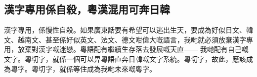 \documentclass[a5paper, 10pt, openany]{book} %
\newcommand*\CJKmovesymbol[1]{\raise.35em\hbox{#1}}
\newcommand*\CJKmove{\punctstyle{plain}%
  \let\CJKsymbol\CJKmovesymbol
  \let\CJKpunctsymbol\CJKsymbol}
\newcommand{\VertCell}[1]{\rotatebox{-90}{\CJKfamily{BabelStoneVert}\CJKmove #1}}
\begin{document}
\subsection*{漢字專用係自殺，粵漢混用可奔日韓}
漢字專用，係慢性自殺。如果廣東話要有希望可以逃出生天，要成為好似日文、韓文、越南文、甚至係好似英文、法文、德文咁偉大嘅語言，我哋就必須放棄漢字專用，放棄對漢字嘅迷戀。粵語配有繼續生存落去發展嘅天直—— 我哋配有自己嘅文字。粵切字，就係一個可以畀粵語直奔日韓嘅文字系統。粵切字，故此，應該成為粵字。粵切字，就係等住成為我哋未來嘅粵字。


\end{document}
